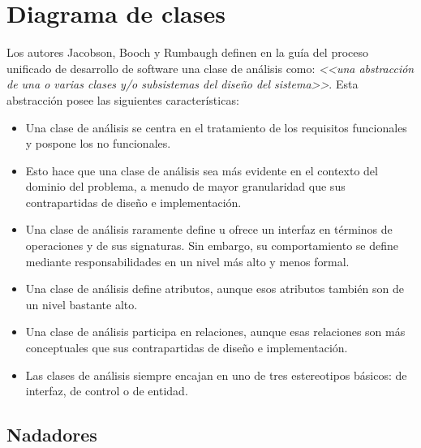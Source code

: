 	\section{Diagrama de clases} %
		\label{sec:diagrama_de_clases}
		
		Los autores Jacobson, Booch y Rumbaugh definen en la guía del proceso unificado de desarrollo de software \cite{PUJac08} una clase de análisis como: {\it <<una abstracción de una o varias clases y/o subsistemas del diseño del sistema>>}. Esta abstracción posee las siguientes características:
		
		\begin{itemize}
			\item Una clase de análisis se centra en el tratamiento de los requisitos funcionales y pospone los no funcionales.
			\item Esto hace que una clase de análisis sea más evidente en el contexto del dominio del problema, a menudo de mayor granularidad que sus contrapartidas de diseño e implementación.
			\item Una clase de análisis raramente define u ofrece un interfaz en términos de operaciones y de sus signaturas. Sin embargo, su comportamiento se define mediante responsabilidades en un nivel más alto y menos formal.
			\item Una clase de análisis define atributos, aunque esos atributos también son de un nivel bastante alto.
			\item Una clase de análisis participa en relaciones, aunque esas relaciones son más conceptuales que sus contrapartidas de diseño e implementación.
			\item Las clases de análisis siempre encajan en uno de tres estereotipos básicos: de interfaz, de control o de entidad.
		\end{itemize}
		
		\subsection{Nadadores} %
			\label{sub:nadadores}
		
